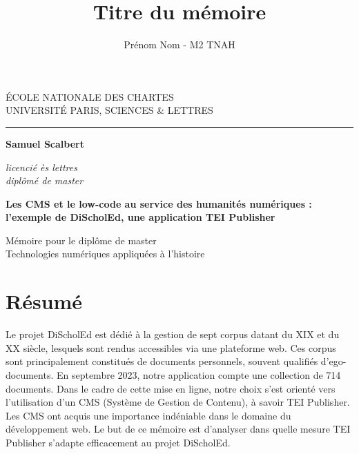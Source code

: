 \documentclass[a4paper,12pt,twoside]{book}
\author{Prénom Nom - M2 TNAH}
\title{Titre du mémoire}
\newcommand{\clearemptydoublepage}{\newpage{\pagestyle{empty}\cleardoublepage}}
\begin{document}
	\begin{titlepage}
		\begin{center}
			
			\bigskip
			
			\begin{large}				
				ÉCOLE NATIONALE DES CHARTES\\
				UNIVERSITÉ PARIS, SCIENCES \& LETTRES
			\end{large}
			\begin{center}\rule{2cm}{0.02cm}\end{center}
			
			\bigskip
			\bigskip
			\bigskip
			\begin{Large}
				\textbf{Samuel Scalbert}\\
			\end{Large}
			\begin{normalsize} \textit{licencié ès lettres}\\
				\textit{diplômé de master}
			\end{normalsize}
			
			\bigskip
			\bigskip
			\bigskip
			
			\begin{Huge}
				\textbf{Les CMS et le low-code au service des humanités numériques : l'exemple de DiScholEd, une application TEI Publisher}\\
			\end{Huge}
			\bigskip
			
			\bigskip
			\bigskip
			\begin{large}
			\end{large}
			\vfill
			
			\begin{large}
				Mémoire 
				pour le diplôme de master \\
				\og{} Technologies numériques appliquées à l'histoire \fg{} \\
			\end{large}
			
		\end{center}
	\end{titlepage}
	
	\thispagestyle{empty}	
	\clearemptydoublepage
	
	\frontmatter
	\chapter{Résumé}
	\medskip
   Le projet DiScholEd est dédié à la gestion de sept corpus datant du XIX et du XX siècle, lesquels sont rendus accessibles via une plateforme web. Ces corpus sont principalement constitués de documents personnels, souvent qualifiés d'ego-documents. En septembre 2023, notre application compte une collection de 714 documents. Dans le cadre de cette mise en ligne, notre choix s'est orienté vers l'utilisation d'un CMS (Système de Gestion de Contenu), à savoir TEI Publisher. Les CMS ont acquis une importance indéniable dans le domaine du développement web. Le but de ce mémoire est d'analyser dans quelle mesure TEI Publisher s'adapte efficacement au projet DiScholEd.\\
	
\end{document}
